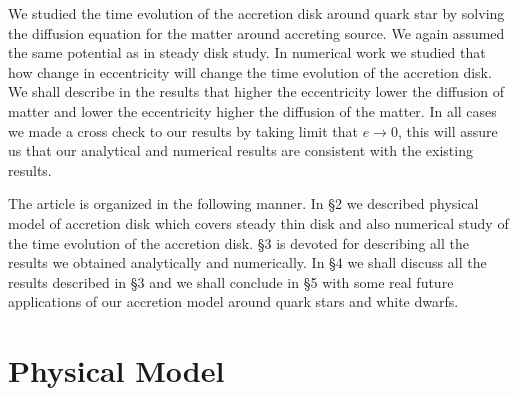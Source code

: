 \documentclass[useAMS,usenatbib]{mn2e}
\begin{document}
We studied the time evolution of the accretion disk around quark star by solving the diffusion equation for the matter around accreting source. We again assumed the same potential as in steady disk study. In numerical work we studied that how change in eccentricity will change the time evolution of the accretion disk. We shall describe in the results that higher the eccentricity lower the diffusion of matter and lower the eccentricity higher the diffusion of the matter. In all cases we made a cross check to our results by taking limit that $e\rightarrow0$, this will assure us that our analytical and numerical results are consistent with the existing results.

The article is organized in the following manner. In \S 2 we described physical model of accretion disk which covers steady thin disk and also numerical study of the time evolution of the accretion disk. \S3 is devoted for describing all the results we obtained analytically and numerically. In \S4 we shall discuss all the results described in \S3 and we shall conclude in \S5 with some real future applications of our accretion model around quark stars and white dwarfs.  
\section{Physical Model}
\end{document}
